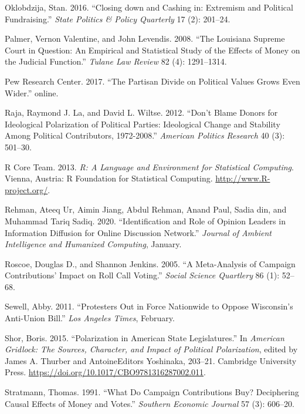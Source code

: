 \documentclass[12pt,]{article}
\begin{document}
\leavevmode\hypertarget{ref-oklobzija}{}%
Oklobdzija, Stan. 2016. ``Closing down and Cashing in: Extremism and
Political Fundraising.'' \emph{State Politics \& Policy Quarterly} 17
(2): 201--24.

\leavevmode\hypertarget{ref-palmer2008}{}%
Palmer, Vernon Valentine, and John Levendis. 2008. ``The Louisiana
Supreme Court in Question: An Empirical and Statistical Study of the
Effects of Money on the Judicial Function.'' \emph{Tulane Law Review} 82
(4): 1291--1314.

\leavevmode\hypertarget{ref-pew2017}{}%
Pew Research Center. 2017. ``The Partisan Divide on Political Values
Grows Even Wider.'' online.

\leavevmode\hypertarget{ref-laraja2011}{}%
Raja, Raymond J. La, and David L. Wiltse. 2012. ``Don't Blame Donors for
Ideological Polarization of Political Parties: Ideological Change and
Stability Among Political Contributors, 1972-2008.'' \emph{American
Politics Research} 40 (3): 501--30.

\leavevmode\hypertarget{ref-r}{}%
R Core Team. 2013. \emph{R: A Language and Environment for Statistical
Computing}. Vienna, Austria: R Foundation for Statistical Computing.
\url{http://www.R-project.org/}.

\leavevmode\hypertarget{ref-rehman2020}{}%
Rehman, Ateeq Ur, Aimin Jiang, Abdul Rehman, Anand Paul, Sadia din, and
Muhammad Tariq Sadiq. 2020. ``Identification and Role of Opinion Leaders
in Information Diffusion for Online Discussion Network.'' \emph{Journal
of Ambient Intelligence and Humanized Computing}, January.

\leavevmode\hypertarget{ref-roscoe2005}{}%
Roscoe, Douglas D., and Shannon Jenkins. 2005. ``A Meta-Analysis of
Campaign Contributions' Impact on Roll Call Voting.'' \emph{Social
Science Quartlery} 86 (1): 52--68.

\leavevmode\hypertarget{ref-sewell2011}{}%
Sewell, Abby. 2011. ``Protesters Out in Force Nationwide to Oppose
Wisconsin's Anti-Union Bill.'' \emph{Los Angeles Times}, February.

\leavevmode\hypertarget{ref-shor2015}{}%
Shor, Boris. 2015. ``Polarization in American State Legislatures.'' In
\emph{American Gridlock: The Sources, Character, and Impact of Political
Polarization}, edited by James A. Thurber and AntoineEditors Yoshinaka,
203--21. Cambridge University Press.
\url{https://doi.org/10.1017/CBO9781316287002.011}.

\leavevmode\hypertarget{ref-stratmann1991}{}%
Stratmann, Thomas. 1991. ``What Do Campaign Contributions Buy?
Deciphering Causal Effects of Money and Votes.'' \emph{Southern Economic
Journal} 57 (3): 606--20.
\end{document}
